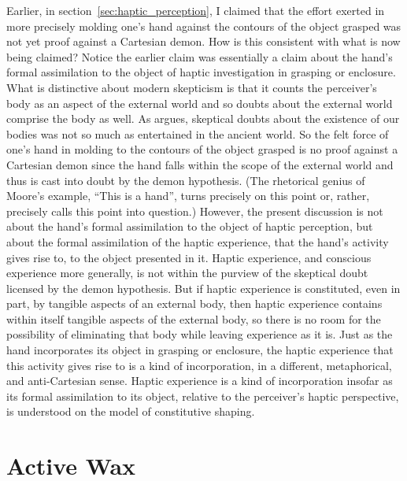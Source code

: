 Earlier, in section~\ref{sec:haptic_perception}, I claimed that the effort exerted in more precisely molding one's hand against the contours of the object grasped was not yet proof against a Cartesian demon. How is this consistent with what is now being claimed? Notice the earlier claim was essentially a claim about the hand's formal assimilation to the object of haptic investigation in grasping or enclosure. What is distinctive about modern skepticism is that it counts the perceiver's body as an aspect of the external world and so doubts about the external world comprise the body as well. As \citet{Burnyeat:1982mz} argues, skeptical doubts about the existence of our bodies was not so much as entertained in the ancient world. So the felt force of one's hand in molding to the contours of the object grasped is no proof against a Cartesian demon since the hand falls within the scope of the external world and thus is cast into doubt by the demon hypothesis. (The rhetorical genius of Moore's \citeyear{Moore:1903uo} example, ``This is a hand'', turns precisely on this point or, rather, precisely calls this point into question.) However, the present discussion is not about the hand's formal assimilation to the object of haptic perception, but about the formal assimilation of the haptic experience, that the hand's activity gives rise to, to the object presented in it. Haptic experience, and conscious experience more generally, is not within the purview of the skeptical doubt licensed by the demon hypothesis. But if haptic experience is constituted, even in part, by tangible aspects of an external body, then haptic experience contains within itself tangible aspects of the external body, so there is no room for the possibility of eliminating that body while leaving experience as it is. Just as the hand incorporates its object in grasping or enclosure, the haptic experience that this activity gives rise to is a kind of incorporation, in a different, metaphorical, and anti-Cartesian sense. Haptic experience is a kind of incorporation insofar as its formal assimilation to its object, relative to the perceiver's haptic perspective, is understood on the model of constitutive shaping.


\section{Active Wax} %
\label{sec:active_wax}

